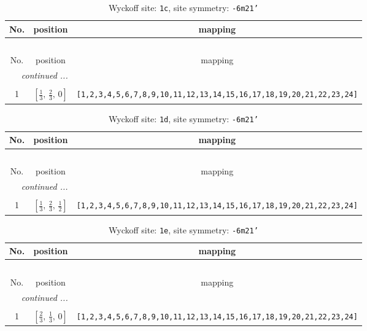 \documentclass[fleqn,8pt]{jsarticle}
\begin{document}
\begin{longtable}{ccc}
\caption{Wyckoff site: {\tt 1c}, site symmetry: {\tt -6m21'}}
 \\
 \hline \hline
No. & position & mapping \\ \hline \endfirsthead

\multicolumn{2}{l}{\tablename\ \thetable{}} \\
 \hline \hline
No. & position & mapping \\ \hline \endhead

 \hline \hline
\multicolumn{2}{r}{\footnotesize\it continued ...} \\ \endfoot

 \hline \hline
\multicolumn{2}{r}{} \\ \endlastfoot

1 & $\left[ \frac{1}{3},\, \frac{2}{3},\, 0 \right]$ & {\tt [1,2,3,4,5,6,7,8,9,10,11,12,13,14,15,16,17,18,19,20,21,22,23,24]} \\
\end{longtable}
\renewcommand{\arraystretch}{1.2}
\begin{longtable}{ccc}
\caption{Wyckoff site: {\tt 1d}, site symmetry: {\tt -6m21'}}
 \\
 \hline \hline
No. & position & mapping \\ \hline \endfirsthead

\multicolumn{2}{l}{\tablename\ \thetable{}} \\
 \hline \hline
No. & position & mapping \\ \hline \endhead

 \hline \hline
\multicolumn{2}{r}{\footnotesize\it continued ...} \\ \endfoot

 \hline \hline
\multicolumn{2}{r}{} \\ \endlastfoot

1 & $\left[ \frac{1}{3},\, \frac{2}{3},\, \frac{1}{2} \right]$ & {\tt [1,2,3,4,5,6,7,8,9,10,11,12,13,14,15,16,17,18,19,20,21,22,23,24]} \\
\end{longtable}
\renewcommand{\arraystretch}{1.2}
\begin{longtable}{ccc}
\caption{Wyckoff site: {\tt 1e}, site symmetry: {\tt -6m21'}}
 \\
 \hline \hline
No. & position & mapping \\ \hline \endfirsthead

\multicolumn{2}{l}{\tablename\ \thetable{}} \\
 \hline \hline
No. & position & mapping \\ \hline \endhead

 \hline \hline
\multicolumn{2}{r}{\footnotesize\it continued ...} \\ \endfoot

 \hline \hline
\multicolumn{2}{r}{} \\ \endlastfoot

1 & $\left[ \frac{2}{3},\, \frac{1}{3},\, 0 \right]$ & {\tt [1,2,3,4,5,6,7,8,9,10,11,12,13,14,15,16,17,18,19,20,21,22,23,24]} \\
\end{longtable}
\end{document}
